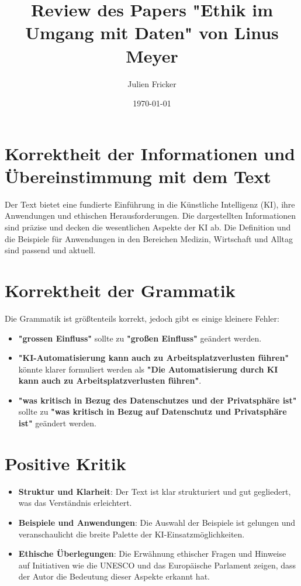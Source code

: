 \documentclass{article}
\title{Review des Papers "Ethik im Umgang mit Daten" von Linus Meyer}
\author{Julien Fricker}
\date{\today}
\begin{document}
\maketitle



\maketitle

\section*{Korrektheit der Informationen und Übereinstimmung mit dem Text}
Der Text bietet eine fundierte Einführung in die Künstliche Intelligenz (KI), ihre Anwendungen und ethischen Herausforderungen. Die dargestellten Informationen sind präzise und decken die wesentlichen Aspekte der KI ab. Die Definition und die Beispiele für Anwendungen in den Bereichen Medizin, Wirtschaft und Alltag sind passend und aktuell.

\section*{Korrektheit der Grammatik}
Die Grammatik ist größtenteils korrekt, jedoch gibt es einige kleinere Fehler:
\begin{itemize}
    \item \textbf{"grossen Einfluss"} sollte zu \textbf{"großen Einfluss"} geändert werden.
    \item \textbf{"KI-Automatisierung kann auch zu Arbeitsplatzverlusten führen"} könnte klarer formuliert werden als \textbf{"Die Automatisierung durch KI kann auch zu Arbeitsplatzverlusten führen"}.
    \item \textbf{"was kritisch in Bezug des Datenschutzes und der Privatsphäre ist"} sollte zu \textbf{"was kritisch in Bezug auf Datenschutz und Privatsphäre ist"} geändert werden.
\end{itemize}

\section*{Positive Kritik}
\begin{itemize}
    \item \textbf{Struktur und Klarheit}: Der Text ist klar strukturiert und gut gegliedert, was das Verständnis erleichtert.
    \item \textbf{Beispiele und Anwendungen}: Die Auswahl der Beispiele ist gelungen und veranschaulicht die breite Palette der KI-Einsatzmöglichkeiten.
    \item \textbf{Ethische Überlegungen}: Die Erwähnung ethischer Fragen und Hinweise auf Initiativen wie die UNESCO und das Europäische Parlament zeigen, dass der Autor die Bedeutung dieser Aspekte erkannt hat.
\end{itemize}
\end{document}
